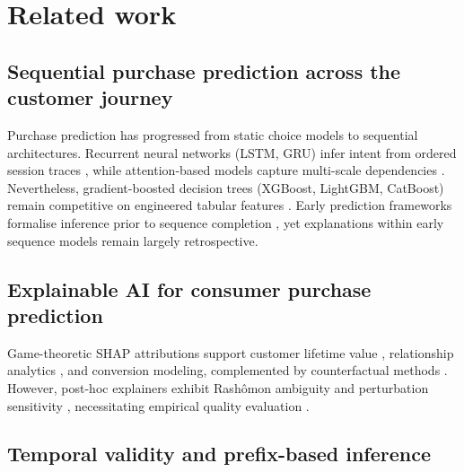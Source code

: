 \documentclass[a4paper]{article}
\begin{document}
\section{Related work}
\label{sec:related}

\subsection{Sequential purchase prediction across the customer journey}
\label{sec:related-prediction}

Purchase prediction has progressed from static choice models
\citep{vandenpoel2005predicting} to sequential architectures. Recurrent neural
networks (LSTM, GRU) infer intent from ordered session traces
\citep{zhang2020learning, zhang2021recurrent, sheu2021knowledge, batmaz2018deep},
while attention-based models capture multi-scale dependencies
\citep{wang2023transformer}. Nevertheless, gradient-boosted decision trees
(XGBoost, LightGBM, CatBoost) remain competitive on engineered tabular features
\citep{chen2016xgboost, ke2017lightgbm, prokhorenkova2018catboost, ahn2023ensemble,
tama2020empirical}. Early prediction frameworks formalise inference prior to
sequence completion \citep{wu2021early, wan2023memory, cheung2023causal}, yet
explanations within early sequence models remain largely retrospective.

\subsection{Explainable AI for consumer purchase prediction}
\label{sec:related-xai}

Game-theoretic SHAP attributions \citep{lundberg2017unified, lundberg2020local}
support customer lifetime value \citep{bauer2021improved, sun2023research},
relationship analytics \citep{kitchens2018advanced}, and conversion modeling,
complemented by counterfactual methods \citep{you2023counterfactual, oliveira2023model,
balbino2023csse, mertes2022ganterfactual}. However, post-hoc explainers exhibit
Rash\^omon ambiguity and perturbation sensitivity \citep{mitrut2024clarity,
slack2020fooling}, necessitating empirical quality evaluation
\citep{bhatt2020evaluating, hedstrom2023quantus}.

\subsection{Temporal validity and prefix-based inference}
\label{sec:related-temporal}
\end{document}
